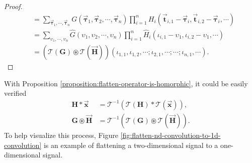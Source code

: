\documentclass[twoside,11pt]{article}
\def\oconv{\circledast}
\def\tvar#1{\mathbf{#1}} %
\def\vsymb#1{\vec{\mathbf{#1}}}
\begin{document}
\begin{proof}
\begin{equation*}
\begin{aligned}
       & = \sum_{\vsymb{\tau}_1, \cdots, \vsymb{\tau}_n} G(\vsymb{\tau}_1, \vsymb{\tau}_2, \cdots, \vsymb{\tau}_n)
      \prod_{i=1}^{n}  H_i (\vsymb{t}_{i,1} - \vsymb{\tau}_i, \vsymb{t}_{i,2} - \vsymb{\tau}_i, \cdots)                                                            \\
       & = \sum_{\upsilon_1, \cdots, \upsilon_n} \hat{G}(\upsilon_1, \upsilon_2, \cdots, \upsilon_n)
      \prod_{i=1}^{n} \hat{H}_i (\iota_{i,1} - \upsilon_1, \iota_{i,2} - \upsilon_1, \cdots)                                                                       \\
       & = \left(\mathcal{T}(\tvar{G}) \oconv \mathcal{T}(\vsymb{H}) \right) (\iota_{1,1}, \iota_{1,2}, \cdots; \iota_{2,1}, \cdots; \cdots; \iota_{n,1}, \cdots).
    \end{aligned}
  \end{equation*}
\end{proof}

With Proposition \ref{proposition:flatten-operator-is-homorphic}, it could be easily verified
\begin{equation*}
  \begin{aligned}
    \tvar{H} * \vsymb{x}      & = \mathcal{T}^{-1} \left( \mathcal{T}(\tvar{H}) * \mathcal{T}(\vsymb{x}) \right),      \\
    \tvar{G} \oconv \vsymb{H} & = \mathcal{T}^{-1} \left( \mathcal{T}(\tvar{G}) \oconv \mathcal{T}(\vsymb{H}) \right).
  \end{aligned}
\end{equation*}
To help visualize this process, Figure \ref{fig:flatten-nd-convolution-to-1d-convolution} is an example of flattening a two-dimensional signal to a one-dimensional signal.
\end{document}
